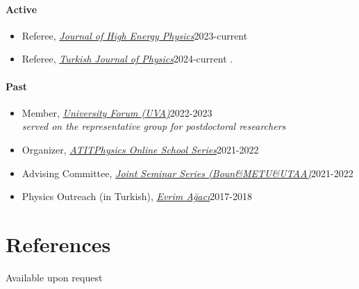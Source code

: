 \documentclass[a4paper,11pt]{article}
\begin{document}
\paragraph{Active}
\begin{itemize}
	\item[] Referee, \emph{\hyperref{https://jhep.sissa.it/}{}{}{Journal of High Energy Physics}}\hfill 2023-current \hspace*{2.2em}
	\item[] Referee, \emph{\hyperref{https://journals.tubitak.gov.tr/physics/}{}{}{Turkish Journal of Physics}}\hfill\hfill 2024-current \hspace*{2.2em} .
\end{itemize}
\paragraph{Past}
\begin{itemize}
	\item[] Member, \emph{\hyperref{https://www.uva.nl/en/about-the-uva/policy-and-regulations/policy/university-forum/university-forum.html}{}{}{University Forum (UVA)}}\hfill 2022-2023 \hspace*{2.2em}\\
	\hspace*{1.8em}\emph{served on the representative group for postdoctoral researchers}
	\item[] Organizer, \emph{\hyperref{https://www.atitphysics.com}{}{}{ATITPhysics Online School Series}}\hfill 2021-2022 \hspace*{2.2em}
	\item[] Advising Committee, \emph{\hyperref{https://sites.google.com/view/boun-metu-utaajointseminerseri/}{}{}{Joint Seminar Series (Boun\&METU\&UTAA)}}\hfill 2021-2022 \hspace*{2.2em}
	\item[] Physics Outreach (in Turkish), \emph{\hyperref{https://youtube.com/playlist?list=PL48IwtBKtXrZcWuuJFpcflBkSqJv6YrW9}{}{}{Evrim Ağacı}}\hfill 2017-2018 \hspace*{2.2em}
\end{itemize}

\section{\textcolor{burntorange}{References}}
\hspace*{2em}Available upon request

\end{document}

